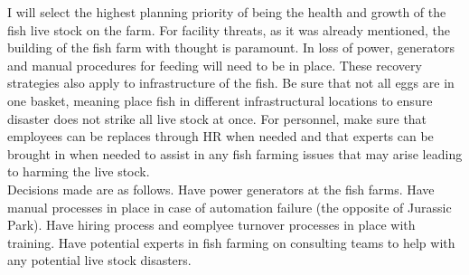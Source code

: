 \documentclass[paper=a4, fontsize=11pt]{scrartcl} %
\numberwithin{equation}{section} %
\numberwithin{figure}{section} %
\numberwithin{table}{section} %
\begin{document}
I will select the highest planning priority of being the health and growth of the
fish live stock on the farm. For facility threats, as it was already mentioned,
the building of the fish farm with thought is paramount. In loss of power, generators
and manual procedures for feeding will need to be in place. These recovery strategies
also apply to infrastructure of the fish. Be sure that not all eggs are in one basket,
meaning place fish in different infrastructural locations to ensure disaster does not
strike all live stock at once. For personnel, make sure that employees can be replaces
through HR when needed and that experts can be brought in when needed to assist in 
any fish farming issues that may arise leading to harming the live stock.\\

Decisions made are as follows. Have power generators at the fish farms. Have
manual processes in place in case of automation failure (the opposite of Jurassic Park).
Have hiring process and eomplyee turnover processes in place with training. Have
potential experts in fish farming on consulting teams to help with any potential
live stock disasters.

\end{document}
